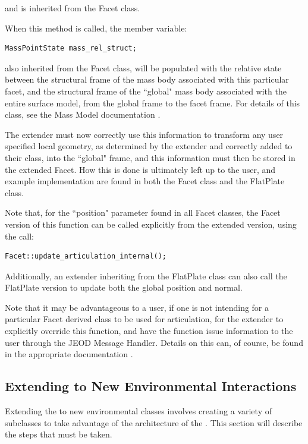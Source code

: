 and is inherited from the Facet class.

When this method is called, the member variable:

\begin{verbatim}
MassPointState mass_rel_struct;
\end{verbatim}

also inherited from the Facet class, will be populated with the relative state between the 
structural frame of the mass body associated
with this particular facet, and the structural frame of the ``global" mass body associated with
the entire surface model, from the global frame to the facet frame. For details of this class,
see the Mass Model documentation \cite{dynenv:MASS}.

The extender must now correctly use this information to transform any user specified local geometry, as determined
by the extender and correctly added to their class, into the ``global" frame, and this information must then be
stored in the extended Facet. How this is done is ultimately left up to the user, and example implementation are found
in both the Facet class and the FlatPlate class.

Note that, for the ``position" parameter found in all Facet classes, the Facet version of this function can be called
explicitly from the extended version, using the call:

\begin{verbatim}
Facet::update_articulation_internal();
\end{verbatim}

Additionally, an extender inheriting from the FlatPlate class can also call the FlatPlate version to update both the global position
and normal.

Note that it may be advantageous to a user, if one is not intending for a particular Facet derived class to be used for articulation,
for the extender to explicitly override this function, and have the function issue information to the user through the JEOD
Message Handler. Details on this can, of course, be found in the appropriate documentation \cite{dynenv:MESSAGE}.

\subsection{Extending to New Environmental Interactions}

Extending the \ModelDesc to new environmental classes involves creating
a variety of subclasses to take advantage of the architecture of the
\ModelDesc. This section will describe the steps that must be taken.

